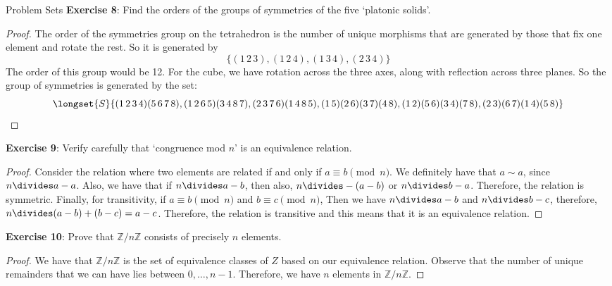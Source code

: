 \documentclass{report}
\begin{document}
\begin{exercises}{Problem Sets}
    \textbf{Exercise 8}: Find the orders of the groups of symmetries of the five `platonic solids'.
        \begin{proof}
            The order of the symmetries group on the tetrahedron is the number of unique morphisms that are generated by those that fix one element and rotate the rest. So it is generated by 
                \begin{equation*}
                    \{(1 \, 2 \, 3), (1 \, 2 \, 4), (1 \, 3 \, 4), (2 \, 3 \, 4)\}
                \end{equation*}
            The order of this group would be 12. For the cube, we have rotation across the three axes, along with reflection across three planes. So the group of symmetries is generated by the set:
                \begin{equation*}
                    \longset{S}{(1 \, 2 \, 3 \, 4)(5 \, 6 \, 7 \, 8), (1 \, 2 \, 6 \, 5)(3 \, 4 \, 8 \, 7), (2 \, 3 \, 7 \, 6)(1 \, 4 \, 8 \, 5), (1 \, 5)(2 \, 6)(3 \, 7)(4 \, 8), (1 \, 2)(5 \, 6)(3 \, 4)(7 \, 8), (2 \, 3)(6 \, 7)(1 \, 4)(5 \, 8)}
                \end{equation*}
            
        \end{proof}

    \textbf{Exercise 9}: Verify carefully that `congruence mod $n$' is an equivalence relation.
        \begin{proof}
            Consider the relation where two elements are related if and only if $a \equiv b \pmod{n}$. We definitely have that $a \sim a$, since $n \divides a - a$. Also, we have that if $n \divides a - b$, then also, $n \divides -(a - b)$ or $n \divides b - a$. Therefore, the relation is symmetric. Finally, for transitivity, if $a \equiv b \pmod{n}$ and $b \equiv c \pmod{n}$, Then we have $n \divides a - b$ and $n \divides b - c$, therefore, $n \divides (a - b) + (b - c) = a - c$. Therefore, the relation is transitive and this means that it is an equivalence relation.
        \end{proof}

    \textbf{Exercise 10}: Prove that $\mathbb{Z} / n\mathbb{Z}$ consists of precisely $n$ elements.
        \begin{proof}
            We have that $\mathbb{Z}/ n\mathbb{Z}$ is the set of equivalence classes of $Z$ based on our equivalence relation. Observe that the number of unique remainders that we can have lies between $0, \ldots, n - 1$. Therefore, we have $n$ elements in $\mathbb{Z}/n\mathbb{Z}$.
        \end{proof}


\end{exercises}
\end{document}
